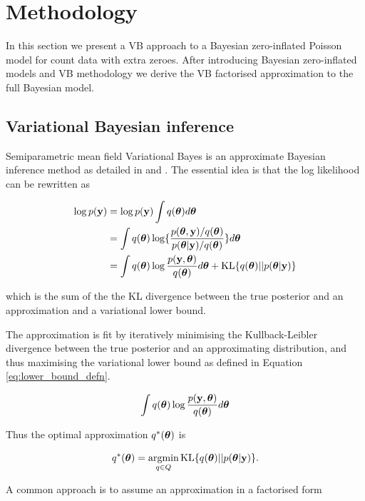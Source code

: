 \documentclass{article}[12pt]
\begin{document}
\section{Methodology}
\label{sec:methodology}

In this section we present a VB approach to a Bayesian zero-inflated Poisson model for count data with extra
zeroes. After introducing Bayesian zero-inflated models and VB methodology we derive the VB factorised
approximation to the full Bayesian model.

\subsection{Variational Bayesian inference}

Semiparametric mean field Variational Bayes is an approximate Bayesian inference method as detailed in
\cite{ormerod10} and \cite{RohdeWand2015}. The essential idea is that the log likelihood can be rewritten as

\begin{align*}
\log p(\vy) &= \log p(\vy) \int q(\vtheta) d \vtheta \\
&= \int q(\vtheta) \log \{ \frac{p(\vtheta, \vy) / q(\vtheta)}{p(\vtheta | \vy) / q(\vtheta)} \} d \vtheta \\
&= \int q(\vtheta) \log \frac{p(\vy, \vtheta)}{q(\vtheta)} d \vtheta +
	 \text{KL} \{ {q(\vtheta) || p(\vtheta|\vy)} \} %
\end{align*}

which is the sum of the the KL divergence between the true posterior and an approximation and a variational
lower bound.

The approximation is fit by iteratively minimising the Kullback-Leibler divergence between the true posterior
and an approximating distribution, and thus maximising the variational lower bound as defined in Equation
\ref{eq:lower_bound_defn}.

\begin{equation}
\label{eq:lower_bound_defn}
\int q({\boldsymbol \theta}) \log \frac{p({\bf y}, {\boldsymbol \theta})}{q({\boldsymbol \theta})} d {\boldsymbol \theta}
\end{equation}

Thus the optimal approximation $q^*({\boldsymbol \theta})$ is

$$
q^*(\vtheta) = \argmin_{q \in Q} \text{KL} \{ {q(\vtheta) || p(\vtheta|\vy)} \}.
$$

A common approach is to assume an approximation in a factorised form
\end{document}
